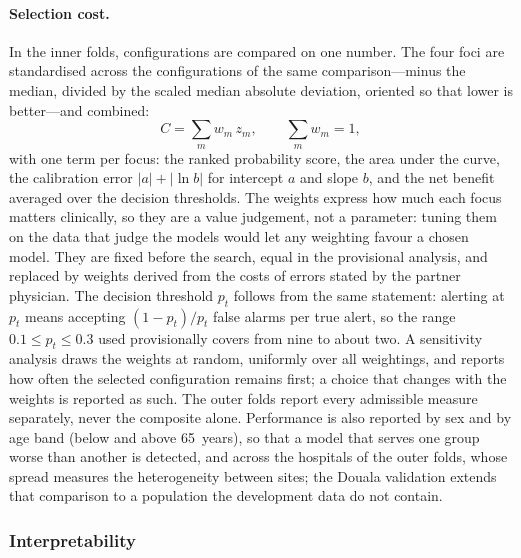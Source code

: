 \paragraph{Selection cost.} In the inner folds, configurations are compared on one number. The four foci are standardised across the configurations of the same comparison---minus the median, divided by the scaled median absolute deviation, oriented so that lower is better---and combined:
\begin{equation}
  C = \sum_{m} w_m\, z_m, \qquad \sum_m w_m = 1,
\end{equation}
with one term per focus: the ranked probability score, the area under the curve, the calibration error $\lvert a\rvert + \lvert \ln b\rvert$ for intercept $a$ and slope $b$, and the net benefit averaged over the decision thresholds. The weights express how much each focus matters clinically, so they are a value judgement, not a parameter: tuning them on the data that judge the models would let any weighting favour a chosen model. They are fixed before the search, equal in the provisional analysis, and replaced by weights derived from the costs of errors stated by the partner physician. The decision threshold $p_t$ follows from the same statement: alerting at $p_t$ means accepting $(1 - p_t)/p_t$ false alarms per true alert, so the range $0.1 \leq p_t \leq 0.3$ used provisionally covers from nine to about two. A sensitivity analysis draws the weights at random, uniformly over all weightings, and reports how often the selected configuration remains first; a choice that changes with the weights is reported as such. The outer folds report every admissible measure separately, never the composite alone. Performance is also reported by sex and by age band (below and above 65~years), so that a model that serves one group worse than another is detected, and across the hospitals of the outer folds, whose spread measures the heterogeneity between sites; the Douala validation extends that comparison to a population the development data do not contain.

\subsubsection{Interpretability}\label{sec:interpretability}\label{sec:imbalance}


